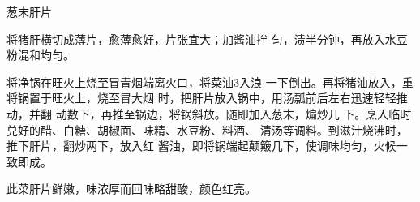 \begin{recipe}{葱末肝片}

\ingredients



\cooking

\step 将猪肝横切成薄片，愈薄愈好，片张宜大；加酱油拌 匀，渍半分钟，再放入水豆粉混和均匀。

\step 将净锅在旺火上烧至冒青烟端离火口，将菜油3入浪 一下倒出。再将猪油放入，重将锅置于旺火上，烧至冒大烟 时，把肝片放入锅中，用汤瓢前后左右迅速轻轻推动，并翻 动数下，再推至锅边，将锅斜放。随即加入葱末，煸炒几 下。烹入临时兑好的醋、白糖、胡椒面、味精、水豆粉、料酒、 清汤等调料。到滋汁烧沸时，推下肝片，翻炒两下，放入红 酱油，即将锅端起颠簸几下，使调味均匀，火候一致即成。

\notes

此菜肝片鲜嫩，味浓厚而回味略甜酸，颜色红亮。

\end{recipe}

